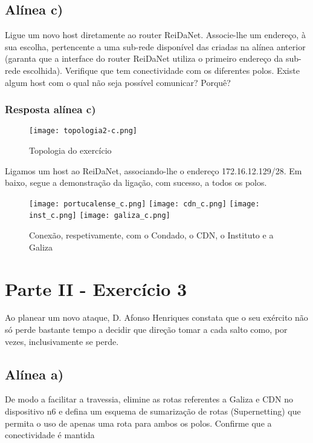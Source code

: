 \documentclass{article}
\begin{document}
\subsection{Alínea c)}

Ligue um novo host diretamente ao router ReiDaNet. Associe-lhe um endereço, à sua escolha, pertencente a uma
sub-rede disponível das criadas na alínea anterior (garanta que a interface do router ReiDaNet utiliza o primeiro
endereço da sub-rede escolhida). Verifique que tem conectividade com os diferentes polos.
Existe algum host com o qual não seja possível comunicar? Porquê?

\subsubsection{Resposta alínea c)}

\begin{figure}[h]
    \centering
    \texttt{[image: topologia2-c.png]}
    \caption{Topologia do exercício}
\end{figure}

Ligamos um host ao ReiDaNet, associando-lhe o endereço 172.16.12.129/28.
Em baixo, segue a demonstração da ligação, com sucesso, a todos os polos.

\begin{figure}[h]
    \centering
    \texttt{[image: portucalense\_c.png]}
    \texttt{[image: cdn\_c.png]}
    \texttt{[image: inst\_c.png]}
    \texttt{[image: galiza\_c.png]}
    \caption{Conexão, respetivamente, com o Condado, o CDN, o Instituto e a Galiza}
\end{figure}


\pagebreak

\section{Parte II - Exercício 3}

Ao planear um novo ataque, D. Afonso Henriques constata que o seu exército não só perde bastante tempo a decidir
que direção tomar a cada salto como, por vezes, inclusivamente se perde.

\subsection{Alínea a)}

De modo a facilitar a travessia, elimine as rotas referentes a Galiza e CDN no dispositivo n6 e defina um
esquema de sumarização de rotas (Supernetting) que permita o uso de apenas uma rota para ambos os
polos. Confirme que a conectividade é mantida
\end{document}
